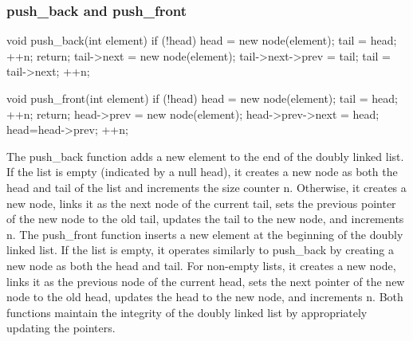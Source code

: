 \documentclass{report}
\begin{document}
    \subsubsection{push\_back and push\_front}
    \bigbreak \noindent 
    \begin{cppcode}
        void push_back(int element) {
            if (!head) {
                head = new node(element);
                tail = head;
                ++n;
                return;
            }
            tail->next = new node(element);
            tail->next->prev = tail;
            tail = tail->next;
            ++n;
        }

        void push_front(int element) {
            if (!head) {
                head = new node(element);
                tail = head;
                ++n;
                return;
            }
            head->prev = new node(element);
            head->prev->next = head;
            head=head->prev;
            ++n;
        }
    \end{cppcode}
    \bigbreak \noindent 
    The push\_back function adds a new element to the end of the doubly linked list. If the list is empty (indicated by a null head), it creates a new node as both the head and tail of the list and increments the size counter n. Otherwise, it creates a new node, links it as the next node of the current tail, sets the previous pointer of the new node to the old tail, updates the tail to the new node, and increments n.
    \bigbreak \noindent 
    The push\_front function inserts a new element at the beginning of the doubly linked list. If the list is empty, it operates similarly to push\_back by creating a new node as both the head and tail. For non-empty lists, it creates a new node, links it as the previous node of the current head, sets the next pointer of the new node to the old head, updates the head to the new node, and increments n. Both functions maintain the integrity of the doubly linked list by appropriately updating the pointers.

    \pagebreak 
\end{document}
